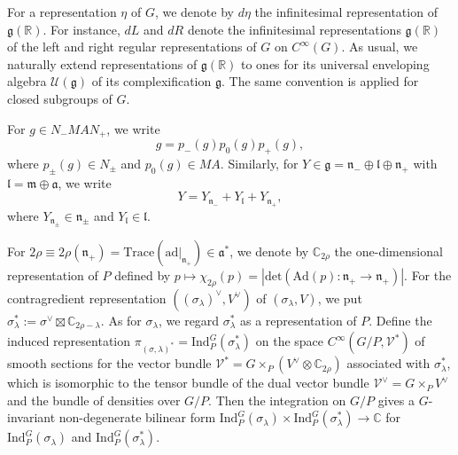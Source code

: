 \documentclass[reqno,11pt]{amsart}
\theoremstyle{remark}
\theoremstyle{definition}
\numberwithin{equation}{section}
\newcommand{\fa}{{\mathfrak a}}
\newcommand{\fg}{{\mathfrak g}}
\newcommand{\fl}{{\mathfrak l}}
\newcommand{\fm}{{\mathfrak m}}
\newcommand{\fn}{{\mathfrak n}}
\newcommand{\R}{\mathbb{R}}
\newcommand{\C}{\mathbb{C}}
\newcommand{\ad}{\mathrm{ad}}
\newcommand{\Cal}{\mathcal}
\newcommand{\abs}[1]{\left\vert#1\right\vert}
\begin{document}
For a representation $\eta$ of $G$, we denote by $d\eta$ 
the infinitesimal representation of $\fg(\R)$. 
For instance,  $dL$ and $dR$ denote the infinitesimal representations $\fg(\R)$ of
the left and right regular representations of $G$ on $C^\infty(G)$.
As usual, we naturally extend representations of $\fg(\R)$ 
to ones for its universal enveloping algebra $\Cal{U}(\fg)$ of its complexification $\fg$.
The same convention is applied for closed subgroups of $G$.

For $g \in N_-MAN_+$, we write
\begin{equation*}
g = p_-(g)p_0(g)p_+(g),
\end{equation*}
where $p_\pm(g) \in N_{\pm}$ and $p_0(g) \in MA$. 
Similarly, for $Y \in \fg = \fn_- \oplus \fl\oplus \fn_+$ with $\fl= \fm \oplus \fa$,
we write
\begin{equation*}
Y=Y_{\fn_-} + Y_{\fl} + Y_{\fn_+},
\end{equation*}
where $Y_{\fn_{\pm}} \in \fn_{\pm}$ and $Y_\fl \in \fl$.

For $2\rho\equiv 2\rho(\fn_+)= \mathrm{Trace}(\ad\vert_{\fn_+})\in \mathfrak{a}^*$,
we denote by  $\C_{2\rho}$ the one-dimensional representation of $P$
defined by
$p \mapsto \chi_{2\rho}(p)=
\abs{\mathrm{det}(\mathrm{Ad}(p)\colon 
\mathfrak{n}_+ \to \mathfrak{n}_+)}$.
For the contragredient representation
$((\sigma_\lambda)^\vee, V^\vee)$ of $(\sigma_\lambda,V)$,
we put
$\sigma^*_\lambda := \sigma^\vee \boxtimes \C_{2\rho-\lambda}$.
As for $\sigma_\lambda$, we regard $\sigma^*_\lambda$ as a representation of $P$.
Define the induced representation
$\pi_{(\sigma, \lambda)^*} = \mathrm{Ind}_P^G(\sigma^*_\lambda)$
on the space $C^\infty(G/P,\mathcal{V}^*)$ of smooth sections 
for the vector bundle $\mathcal{V}^*=G\times_P (V^\vee\otimes \C_{2\rho})$
associated with $\sigma^*_\lambda$, which is isomorphic to the tensor bundle
of the dual vector bundle $\mathcal{V}^\vee = G\times_PV^\vee$ and the bundle
of densities over $G/P$.
Then the integration on $G/P$ gives a 
$G$-invariant non-degenerate bilinear form
$
\mathrm{Ind}^G_P(\sigma_\lambda) 
\times \mathrm{Ind}^G_P(\sigma^*_\lambda) \to \C
$
for $\mathrm{Ind}^G_P(\sigma_\lambda)$ and 
$\mathrm{Ind}^G_P(\sigma^*_\lambda)$.
\end{document}
